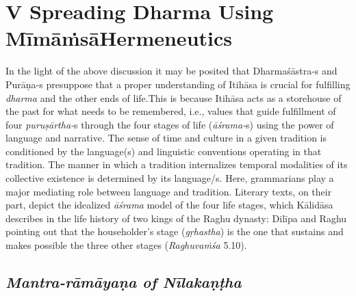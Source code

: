 \section*{V Spreading Dharma Using Mīmāṁsā\hfill \break Hermeneutics}

In the light of the above discussion it may be posited that Dharmaśāstra-s and Purāṇa-s presuppose that a proper understanding of Itihāsa is crucial for fulfilling \textit{dharma} and the other ends of life.This is because Itihāsa acts as a storehouse of the past for what needs to be remembered, i.e., values that guide fulfillment of four \textit{puruṣārtha-}s through the four stages of life (\textit{āśrama-}s) using the power of language and narrative. The sense of time and culture in a given tradition is conditioned by the language(s) and linguistic conventions operating in that tradition. The manner in which a tradition internalizes temporal modalities of its collective existence is determined by its language/s. Here, grammarians play a major mediating role between language and tradition. Literary texts, on their part, depict the idealized \textit{āśrama} model of the four life stages, which Kālidāsa describes in the life history of two kings of the Raghu dynasty: Dilīpa and Raghu pointing out that the householder’s stage (\textit{gṛhastha}) is the one that sustains and makes possible the three other stages (\textit{Raghuvaṁśa} 5.10).

\subsection*{\textit{Mantra-rāmāyaṇa of Nīlakaṇṭha}}

